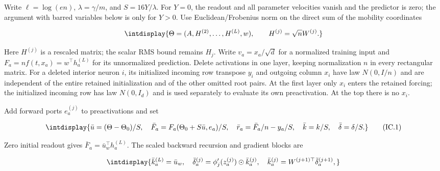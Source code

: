 \mbox{}\par\smallskip


Write \(\ell=\log(en)\), \(\lambda=\gamma/m\), and \(S=16Y/\lambda\). For \(Y=0\), the readout and all parameter velocities vanish and the predictor is zero; the argument with barred variables below is only for \(Y>0\). Use Euclidean/\allowbreak Frobenius norm on the direct sum of the mobility coordinates


\begingroup\renewcommand{\theHequation}{intdisplay.291}
\begin{equation*}
\intdisplay{
\Theta=(A,H^{(2)},\ldots,H^{(L)},w),\qquad H^{(j)}=\sqrt nW^{(j)}.
}
\end{equation*}
\endgroup


Here \(H^{(j)}\) is a rescaled matrix; the scalar RMS bound remains \(H_j\). Write \(v_a=x_a/\sqrt d\) for a normalized training input and \(F_a=n f(t,\allowbreak x_a)=w^\top h_a^{(L)}\) for its unnormalized prediction. Delete activations in one layer, keeping normalization \(n\) in every rectangular matrix. For a deleted interior neuron \(i\), its initialized incoming row transpose \(y_i\) and outgoing column \(x_i\) have law \(N(0,\allowbreak I/n)\) and are independent of the entire retained initialization and of the other omitted root pairs. At the first layer only \(x_i\) enters the retained forcing; the initialized incoming row has law \(N(0,\allowbreak I_d)\) and is used separately to evaluate its own preactivation. At the top there is no \(x_i\).



Add forward ports \(e_a^{(j)}\) to preactivations and set


\begingroup\renewcommand{\theHequation}{intdisplay.292}
\begin{equation}
\intdisplay{
\bar u=(\Theta-\Theta_0)/S,\quad
 \bar F_a=F_a(\Theta_0+S\bar u,e_a)/S,
 \quad\bar r_a=\bar F_a/n-y_a/S,\quad
 \bar k=k/S,\quad\bar\delta=\delta/S.
}
\tag{IC.1}
\label{int:eq-0118-ic-1}
\end{equation}
\endgroup


Zero initial readout gives \(\bar F_a=\bar u_w^\top h_a^{(L)}\). The scaled backward recursion and gradient blocks are


\begingroup\renewcommand{\theHequation}{intdisplay.293}
\begin{equation*}
\intdisplay{
\bar k_a^{(L)}=\bar u_w,\quad
 \bar\delta_a^{(j)}=\phi_j'(z_a^{(j)})\odot\bar k_a^{(j)},\quad
 \bar k_a^{(j)}=W^{(j+1)\top}\bar\delta_a^{(j+1)},
}
\end{equation*}
\endgroup

